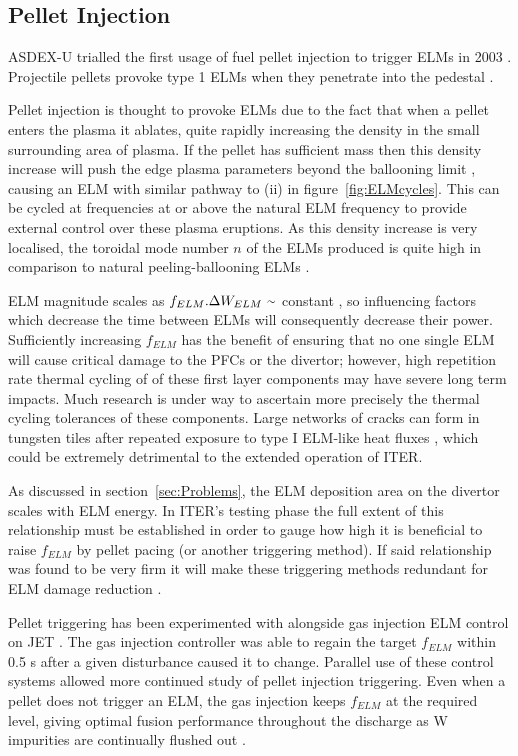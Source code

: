 \documentclass[11pt, twocolumn]{article}  %
\providecommand{\squiggle}{\raise.17ex\hbox{$\scriptstyle\sim$}} %
\begin{document}
\subsection{Pellet Injection}\label{ssec:PInjection}
ASDEX-U trialled the first usage of fuel pellet injection to trigger ELMs in 2003 \cite{Lang2003}. Projectile pellets provoke type 1 ELMs when they penetrate into the pedestal \cite{KirkFF}. 

Pellet injection is thought to provoke ELMs due to the fact that when a pellet enters the plasma it ablates, quite rapidly increasing the density in the small surrounding area of plasma. If the pellet has sufficient mass then this density increase will push the edge plasma parameters beyond the ballooning limit \cite{Baylor2015}, causing an ELM with similar pathway to (ii) in figure~\ref{fig:ELMcycles}. This can be cycled at frequencies at or above the natural ELM frequency to provide external control over these plasma eruptions. As this density increase is very localised, the toroidal mode number $n$ of the ELMs produced is quite high in comparison to natural peeling-ballooning ELMs \cite{Baylor2015}.

ELM magnitude scales as $f_{ELM}.\Delta W_{ELM}~\squiggle$ constant \cite{Loarte2002,Leonard1999,KirkFF}, so influencing factors which decrease the time between ELMs will consequently decrease their power. Sufficiently increasing $f_{ELM}$ has the benefit of ensuring that no one single ELM will cause critical damage to the PFCs or the divertor; however, high repetition rate thermal cycling of of these first layer components may have severe long term impacts. Much research is under way to ascertain more precisely the thermal cycling tolerances of these components. Large networks of cracks can form in tungsten tiles after repeated exposure to type I ELM-like heat fluxes \cite{Linke2011}, which could be extremely detrimental to the extended operation of ITER.

As discussed in section~\ref{sec:Problems}, the ELM deposition area on the divertor scales with ELM energy. In ITER's testing phase the full extent of this relationship must be established in order to gauge how high it is beneficial to raise $f_{ELM}$ by pellet pacing (or another triggering method). If said relationship was found to be very firm it will make these triggering methods redundant for ELM damage reduction \cite{Lang2013}.

Pellet triggering has been experimented with alongside gas injection ELM control on JET \cite{Lennholm2015}. The gas injection controller was able to regain the target $f_{ELM}$ within 0.5 s after a given disturbance caused it to change. Parallel use of these control systems allowed more continued study of pellet injection triggering. Even when a pellet does not trigger an ELM, the gas injection keeps $f_{ELM}$ at the required level, giving optimal fusion performance throughout the discharge as W impurities are continually flushed out \cite{Lennholm2015}.
\end{document}
